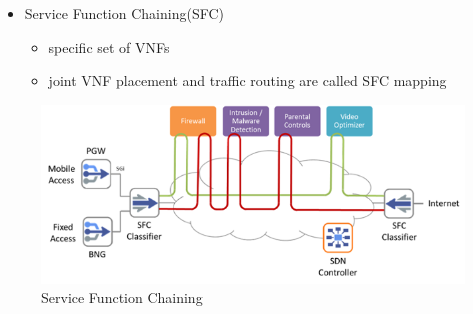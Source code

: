 \documentclass{beamer}
\begin{document}
\begin{frame}
	\begin{itemize}
		\item {Service Function Chaining(SFC)}	
		\begin{itemize}
			\item{specific set of VNFs}
			\item{joint VNF placement and traffic routing
				are called SFC mapping}	
		\end{itemize}
	\end{itemize}
\begin{figure}
	\centering
	\includegraphics[width=0.9\linewidth]{sfcexample}
	\caption{Service Function Chaining}
	\label{fig:sfcexample}
\end{figure}
\end{frame}
\end{document}

